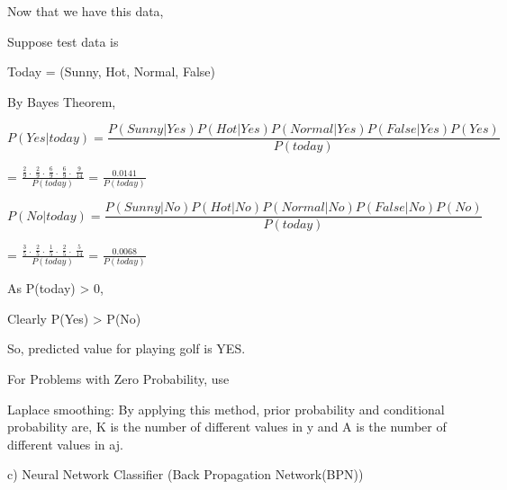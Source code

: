 \documentclass[12pt]{article}
\renewcommand{\_}{\kern-1.5pt\textunderscore\kern-1.5pt}
\begin{document}

\par

Now that we have this data, \par

Suppose test data is \par

Today = (Sunny, Hot, Normal, False)\par

By Bayes Theorem, \par

 \[ P \left( Yes \vert today \right)  = \frac{P \left( Sunny \vert Yes \right)  P \left( Hot \vert Yes \right)  P \left( Normal \vert Yes \right)  P \left( False \vert Yes \right)  P \left( Yes \right)  }{P \left( today \right) } \] \par

=  \( \frac{\frac{2}{9}~.~~\frac{2}{9}~.~~\frac{6}{9}~.~~\frac{6}{9}~.~~\frac{9}{14}}{P \left( today \right) } \)  =  \( \frac{0.0141}{P \left( today \right) } \) \par

 \[ P \left( No \vert today \right)  = \frac{P \left( Sunny \vert No \right)  P \left( Hot \vert No \right)  P \left( Normal \vert No \right)  P \left( False \vert No \right)  P \left( No \right)  }{P \left( today \right) } \] \par

=  \( \frac{\frac{3}{5}~.~~\frac{2}{5}~.~~\frac{1}{5}~.~~\frac{2}{5}~.~~\frac{5}{14}}{P \left( today \right) } \)  =  \( \frac{0.0068}{P \left( today \right) } \) \par

As P(today) > 0, \par

Clearly P(Yes) > P(No)\par

So, predicted value for playing golf is YES.\par


\vspace{\baselineskip}
For Problems with Zero Probability, use\par

Laplace smoothing: By applying this method, prior probability and conditional probability are, K is the number of different values in y and A is the number of different values in aj.\par


\vspace{\baselineskip}
\begin{Center}
{\fontsize{18pt}{21.6pt}\selectfont c) Neural Network Classifier (Back Propagation Network(BPN))\par}
\end{Center}\par
\end{document}
